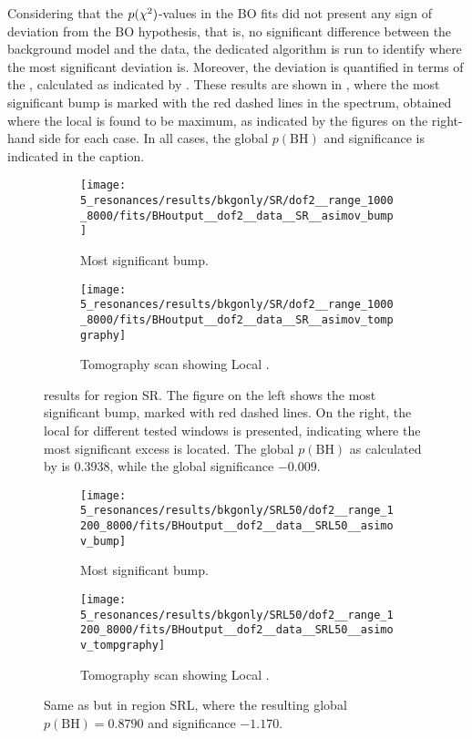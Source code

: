 Considering that the \(p(\chi^{2})\)-values in the \ac{BO} fits did not present any sign of deviation from the \ac{BO} hypothesis, that is, no significant difference between the background model and the data, the dedicated \bh algorithm is run to identify where the most significant deviation is. Moreover, the deviation is quantified in terms of the \bh \pval, calculated as indicated by \Eqn{\ref{eq:strategy:stat_treatment:bh:bh_pval}}.
These results are shown in \Figrange{\ref{fig:results:results:bkgonly:bh:SR}}{\ref{fig:results:results:bkgonly:bh:SRB}}, where the most significant bump is marked with the red dashed lines in the \myj spectrum, obtained where the local \pval is found to be maximum, as indicated by the figures on the right-hand side for each case. In all cases, the global \(p(\text{BH})\) and significance is indicated in the caption.

\begin{figure}[ht!]
    \centering
    \begin{subfigure}[h]{0.49\linewidth}
        \centering
        \texttt{[image: 5\_resonances/results/bkgonly/SR/dof2\_\_range\_1000\_8000/fits/BHoutput\_\_dof2\_\_data\_\_SR\_\_asimov\_bump]}
        \caption{Most significant bump.}
    \end{subfigure}
    \hfill
    \begin{subfigure}[h]{0.49\linewidth}
        \centering
        \texttt{[image: 5\_resonances/results/bkgonly/SR/dof2\_\_range\_1000\_8000/fits/BHoutput\_\_dof2\_\_data\_\_SR\_\_asimov\_tompgraphy]}
        \caption{Tomography scan showing Local \pval.}
    \end{subfigure}
    \caption{\bh results for region SR. The figure on the left shows the most significant bump, marked with red dashed lines. On the right, the local \pval for different tested windows is presented, indicating where the most significant excess is located. The global \(p(\text{BH})\) as calculated by \Eqn{\ref{eq:strategy:stat_treatment:bh:bh_pval}} is \(0.3938\), while the global significance \(-0.009\).}
    \label{fig:results:results:bkgonly:bh:SR}
\end{figure}

\begin{figure}[ht!]
    \centering
    \begin{subfigure}[h]{0.49\linewidth}
        \centering
        \texttt{[image: 5\_resonances/results/bkgonly/SRL50/dof2\_\_range\_1200\_8000/fits/BHoutput\_\_dof2\_\_data\_\_SRL50\_\_asimov\_bump]}
        \caption{Most significant bump.}
    \end{subfigure}
    \hfill
    \begin{subfigure}[h]{0.49\linewidth}
        \centering
        \texttt{[image: 5\_resonances/results/bkgonly/SRL50/dof2\_\_range\_1200\_8000/fits/BHoutput\_\_dof2\_\_data\_\_SRL50\_\_asimov\_tompgraphy]}
        \caption{Tomography scan showing Local \pval.}
    \end{subfigure}
    \caption{Same as \Fig{\ref{fig:results:results:bkgonly:bh:SR}} but in region SRL, where the resulting global \(p(\text{BH}) = 0.8790\) and significance \(-1.170\).}
    \label{fig:results:results:bkgonly:bh:SRL}
\end{figure}

